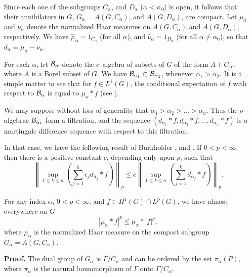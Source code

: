 \documentclass[12pt,leqno]{article}
\begin{document}
Since each one of the subgroups $C_\alpha$, and
$D_\alpha$ ($\alpha<\alpha_0$) is open, it follows that 
their annihilators in $G$,
$G_\alpha=A(G,C_\alpha)$, and $A(G,D_\alpha)$, are compact.
Let $\mu_\alpha$ and $\nu_\alpha$ denote 
the normalized Haar measures on $A(G,C_\alpha)$
and $A(G,D_\alpha)$, respectively.
We have 
$\widehat{\mu}_\alpha=1_{C_\alpha}$ (for all
$\alpha$),
and 
$\widehat{\nu}_\alpha=1_{D_\alpha}$ 
(for all $\alpha\neq \alpha_0$), so that
$d_\alpha=\mu_\alpha -\nu_\alpha$.

For each $\alpha$,
let ${\cal B}_\alpha$ denote the 
$\sigma$-algebra of subsets of $G$ of the form
$A+G_\alpha$, where $A$ is a Borel subset of $G$.  
We have ${\cal B}_{\alpha_1}\subset
{\cal B}_{\alpha_2}$, whenever $\alpha_1>\alpha_2$. 
It is a simple matter to see that for 
$f\in L^1(G)$, the conditional expectation of
$f$ with respect to ${\cal B}_\alpha$
is equal to
$\mu_\alpha*f$ 
(see \cite[Chapter 5, Section 2]{eg}).

We may suppose without
loss of generality that
$\alpha_1>\alpha_2>\ldots>\alpha_n$.
Thus the $\sigma$-algebras ${\cal B}_{\alpha_k}$ form a filtration, and the
sequence $(d_{\alpha_1}*f, d_{\alpha_2}*f,\ldots,d_{\alpha_n}*f)$ 
is a martingale
difference sequence with respect to this filtration.

In that case, we have the following result
of Burkholder \cite[Inequality (1.7)]{bur}, and \cite{bur1}.  If
$0<p<\infty$, then there is a positive constant $c$, depending only
upon $p$, such that
\begin{equation}
\label{burkholder's inequality}
\left\| \sup_{1 \le k \le n} 
\left( \sum_{j=1}^k \epsilon_j d_{\alpha_j}*f\right) \right\|_p
\le
c
\left\| \sup_{1 \le k \le n} 
\left( \sum_{j=1}^k d_{\alpha_j}*f\right) \right\|_p.
\end{equation}

\begin{lemma}
For any index $\alpha$, $0<p<\infty$, and $f\in H^1(G)\cap L^p(G)$, we have  
almost everywhere on $G$
\begin{equation}
\left|
\mu_\alpha *f
\right|^p
\leq
\mu_\alpha*\left| f\right|^p,
\label{eq1.95}
\end{equation}
where $\mu_\alpha$ is the normalized Haar measure on the compact subgroup
$G_\alpha=A(G,C_\alpha)$.
\label{improved jensen}
\end{lemma}
%
{\bf Proof.}
The dual group of $G_\alpha$ is
$\Gamma/C_\alpha$ and can be ordered by the set
$\pi_\alpha (P)$, where 
$\pi_\alpha$ is the natural homomorphism of $\Gamma$ onto 
$\Gamma/C_\alpha$.
\end{document}
